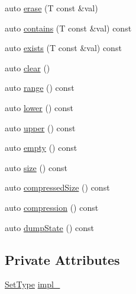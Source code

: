 \begin{DoxyCompactItemize}
\item 
auto \hyperlink{structvt_1_1term_1_1interval_1_1_strong_integral_set_aabff90c89e73f60251264b5776fe175e}{erase} (T const \&val)
\item 
auto \hyperlink{structvt_1_1term_1_1interval_1_1_strong_integral_set_aaca7ed00060bc0fd7ae981b371642795}{contains} (T const \&val) const
\item 
auto \hyperlink{structvt_1_1term_1_1interval_1_1_strong_integral_set_a4dc2dd8090dda60cc1e14ee2771786d1}{exists} (T const \&val) const
\item 
auto \hyperlink{structvt_1_1term_1_1interval_1_1_strong_integral_set_a46b9bb71566c5d6ba45d641ea7df0f09}{clear} ()
\item 
auto \hyperlink{structvt_1_1term_1_1interval_1_1_strong_integral_set_ab0fc4f9f1f9d687b7d0b7308a4a856da}{range} () const
\item 
auto \hyperlink{structvt_1_1term_1_1interval_1_1_strong_integral_set_a640d829d912ce07095ad70206b9a87ba}{lower} () const
\item 
auto \hyperlink{structvt_1_1term_1_1interval_1_1_strong_integral_set_a49bbf645bde26d0c9afba3d4c18bba9b}{upper} () const
\item 
auto \hyperlink{structvt_1_1term_1_1interval_1_1_strong_integral_set_aa1a3cffaf2c886c16daf050f1bf9bc90}{empty} () const
\item 
auto \hyperlink{structvt_1_1term_1_1interval_1_1_strong_integral_set_a4627bb98f3f3554a389749e34f8bdef4}{size} () const
\item 
auto \hyperlink{structvt_1_1term_1_1interval_1_1_strong_integral_set_a4cac42c716057ac5c1a6ac9da54f9edb}{compressed\+Size} () const
\item 
auto \hyperlink{structvt_1_1term_1_1interval_1_1_strong_integral_set_a1dd710e62148fc63329b0cd28cdcaf70}{compression} () const
\item 
auto \hyperlink{structvt_1_1term_1_1interval_1_1_strong_integral_set_a689e0bdef33b443174b408165861bbfe}{dump\+State} () const
\end{DoxyCompactItemize}
\subsection*{Private Attributes}
\begin{DoxyCompactItemize}
\item 
\hyperlink{structvt_1_1term_1_1interval_1_1_strong_integral_set_a8ddaa89df13b55d7a13b6275c162f51e}{Set\+Type} \hyperlink{structvt_1_1term_1_1interval_1_1_strong_integral_set_a39785ca73a01b9e8f34c90af37380dd3}{impl\+\_\+}
\end{DoxyCompactItemize}


